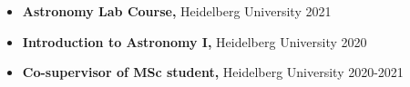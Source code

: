 \begin{itemize}
    \item \textbf{Astronomy Lab Course,} Heidelberg University \hfill 2021
    \item \textbf{Introduction to Astronomy I,} Heidelberg University \hfill 2020
    \item \textbf{Co-supervisor of MSc student,} Heidelberg University \hfill 2020-2021
\end{itemize}